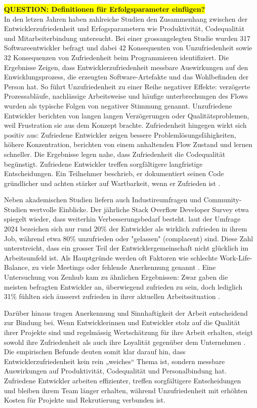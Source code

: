 \documentclass[12pt,a4paper]{report}
\newcommand{\question}[1]{\colorbox{yellow}{\textbf{QUESTION: #1}}\\}
\begin{document}
\question{Definitionen für Erfolgsparameter einfügen?}
In den letzen Jahren haben zahlreiche Studien den Zusammenhang zwischen der Entwicklerzufriedenheit und Erfogsparametern wie 
Produktivität, Codequalität und Mitarbeiterbindung untersucht. Bei einer grossangelegten Studie wurden 317 Softwareentwickler
befragt und dabei 42 Konsequenten von Unzufriedenheit sowie 32 Konsequenzen von Zufriedenheit beim Programmieren identifiziert.
Die Ergebnisse Zeigen, dass Entwicklerzufriedenheit messbare Auswirkungen auf den Enwicklungsprozess, die erzeugten 
Software-Artefakte und das Wohlbefinden der Person hat. So führt Unzufriedenheit zu einer Reihe negativer Effekte: verzögerte
Prozessabläufe, nachlässige Arbeitsweise und häufige unterbrechungen des Flows wurden als typische Folgen von negativer Stimmung
genannt. Unzufriedene Entwickler berichten von langen langen Verzögerungen oder Qualitätsproblemen, weil Frustration sie aus dem
Konzept brachte. Zufriedenheit hingegen wirkt sich positiv aus: Zufriedene Entwickler zeigen bessere Problemlösungsfähigkeiten,
höhere Konzentration, berichten von einem anhaltenden Flow Zustand und lernen schneller. Die Ergebnisse legen nahe, dass 
Zufriedenheit die Codequalität begünstigt. Zufriedene Entwickler treffen sorgfältigere langfristige Entscheidungen. Ein Teilnehmer
beschrieb, er dokumentiert seinen Code gründlicher und achten stärker auf Wartbarkeit, wenn er Zufrieden ist 
\cite{graziotin_what_2018}.

Neben akademischen Studien liefern auch Industireumfragen und Community-Studien wertvolle Einblicke. Der jährliche Stack Overflow
Developer Survey etwa spiegelt wieder, dass weiterhin Verbesserungsbedarf besteht. laut der Umfrage 2024 bezeichen sich nur rund 
20\% der Entwickler als wirklich zufrieden in ihrem Job, während etwa 80\% unzufrieden oder "gelassen" (complacent) sind. Diese Zahl
unterstreicht, dass ein grosser Teil der Entwicklergemeinschaft nicht glücklich im Arbeitsumfeld ist. Als Hauptgründe werden oft
Faktoren wie schlechte Work-Life-Balance, zu viele Meetings oder fehlende Anerkennung genannt \cite{stackoverflow_survey_2025}. Eine
Untersuchung von Zenhub kam zu ähnlichen Ergebnissen: Zwar gaben die meisten befragten Entwickler an, überwiegend zufrieden zu sein,
doch lediglich 31\% fühlten sich äusserst zufrieden in ihrer aktuellen Arbeitssituation \cite{zenhub_2022_nodate}. 

Darüber hinaus tragen Anerkennung und Sinnhaftigkeit der Arbeit entscheidend zur Bindung bei. Wenn Entwicklerinnen und Entwickler
stolz auf die Qualität ihrer Projekte sind und regelmässig Wertschätzung für ihre Arbeit erhalten, steigt sowohl ihre Zufriedenheit
als auch ihre Loyalität gegenüber dem Unternehmen \cite{sadowski_happiness_2019,graziotin_what_2018}. Die empirischen Befunde deuten
somit klar darauf hin, dass Entwicklerzufriedenheit kein rein „weiches“ Thema ist, sondern messbare Auswirkungen auf Produktivität,
Codequalität und Personalbindung hat. Zufriedene Entwickler arbeiten effizienter, treffen sorgfältigere Entscheidungen und bleiben
ihrem Team länger erhalten, während Unzufriedenheit mit erhöhten Kosten für Projekte und Rekrutierung verbunden ist.
\end{document}
